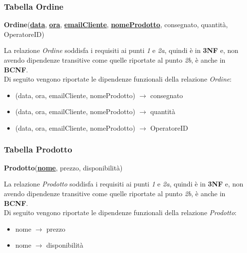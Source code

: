 \documentclass[12pt,a4paper]{article}
\begin{document}
    \subsubsection*{Tabella Ordine}
    \begin{tcolorbox}[
        colback=gray!8,
        colframe=black!30,
        title=
    ]
        \textbf{Ordine}(\uline{\textbf{data}}, \textbf{\uline{ora}}, \textbf{\uline{emailCliente}}, \textbf{\uline{nomeProdotto}}, consegnato, quantità, OperatoreID)
    \end{tcolorbox}
    
    \noindent
    La relazione \textit{Ordine} soddisfa i requisiti ai punti \textit{1} e \textit{2a}, quindi è in \textbf{3NF} e, non avendo dipendenze transitive come quelle riportate al punto \textit{2b}, è anche in \textbf{BCNF}.\\
    Di seguito vengono riportate le dipendenze funzionali della relazione \textit{Ordine}:
    \begin{itemize}[leftmargin=1em, label=$\circ$]
        \item (data, ora, emailCliente, nomeProdotto) $\rightarrow$ consegnato
        \item (data, ora, emailCliente, nomeProdotto) $\rightarrow$ quantità
        \item (data, ora, emailCliente, nomeProdotto) $\rightarrow$ OperatoreID
    
    \end{itemize}

    \subsubsection*{Tabella Prodotto}
    \begin{tcolorbox}[
        colback=gray!8,
        colframe=black!30,
        title=
    ]
        \textbf{Prodotto}(\textbf{\uline{nome}}, prezzo, disponibilità)
    \end{tcolorbox}
    
    \noindent
    La relazione \textit{Prodotto} soddisfa i requisiti ai punti \textit{1} e \textit{2a}, quindi è in \textbf{3NF} e, non avendo dipendenze transitive come quelle riportate al punto \textit{2b}, è anche in \textbf{BCNF}.\\
    Di seguito vengono riportate le dipendenze funzionali della relazione \textit{Prodotto}:
    \begin{itemize}[leftmargin=1em, label=$\circ$]
        \item nome $\rightarrow$ prezzo
        \item nome $\rightarrow$ disponibilità
    \end{itemize}
\end{document}
